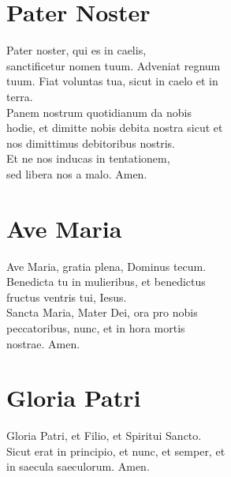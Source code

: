 \documentclass[paper=a5,pagesize=pdftex,fontsize=10pt,headinclude=on,twoside=off]{scrbook}
\begin{document}
\section{Pater Noster}
\begin{scripture}
  \begin{poetry}
    Pater noster, qui es in caelis,\\
    sanctificetur nomen tuum. Adveniat regnum\\
    tuum. Fiat voluntas tua, sicut in caelo et in\\
    terra.\\
    Panem nostrum quotidianum da nobis\\
    hodie, et dimitte nobis debita nostra sicut et\\
    nos dimittimus debitoribus nostris.\\
    Et ne nos inducas in tentationem,\\
    sed libera nos a malo.
    Amen.\\
  \end{poetry}
\end{scripture}

\section{Ave Maria}
\begin{scripture}
  \begin{poetry}
    Ave Maria, gratia plena, Dominus tecum.\\
    Benedicta tu in mulieribus, et benedictus\\
    fructus ventris tui, Iesus.\\
    Sancta Maria, Mater Dei, ora pro nobis\\
    peccatoribus, nunc, et in hora mortis\\
    nostrae. Amen.\\
  \end{poetry}
\end{scripture}

\newpage
\section{Gloria Patri}
\begin{scripture}
  \begin{poetry}
    Gloria Patri, et Filio, et Spiritui Sancto.\\
    Sicut erat in principio, et nunc, et semper, et\\
    in saecula saeculorum. Amen.
  \end{poetry}
\end{scripture}
\end{document}
